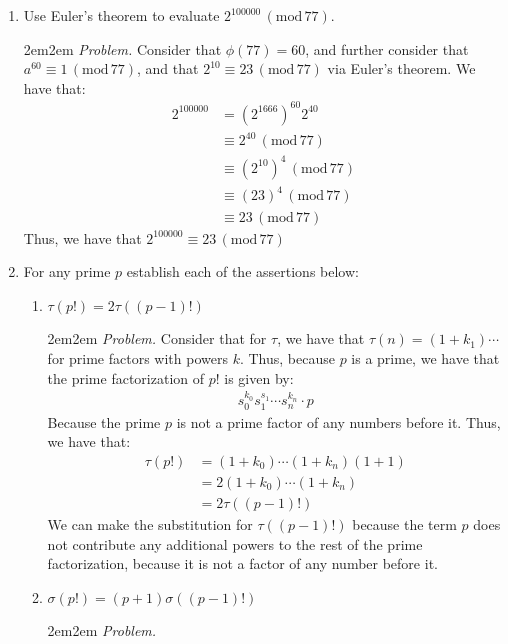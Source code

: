 \documentclass[10pt,oneside]{book}
\newcommand{\gspc}{\vspace{0.13cm}} %
\newcommand{\gmod}[1]{\,(\text{mod}\,#1)}
\let\endoldproof\endproof
\newenvironment{problem}[1]
  {\vspace{-0.1cm}\begin{coloredadjust}\begin{adjustwidth}{2em}{2em}
   \textit{Problem. }#1}
  {\endoldproof
\end{adjustwidth}\end{coloredadjust}\gspc}
\begin{document}
\begin{enumerate}
\begin{enumerate}
\begin{problem}
\begin{align*}
				&\equiv 21\cdot 25\cdot 10 \gmod{49}\\
				&\equiv 7 \gmod{49}
			\end{align*}
			Thus, $x \equiv 7 \gmod{49}$ is a valid solution. 
		\end{problem}
		\item [9.] Use Euler's theorem to evaluate $2^{100000}\gmod{77}$.
		\begin{problem}
			Consider that $\phi(77)= 60$, and further consider that $a^60\equiv 1\gmod{77}$, and that $2^{10}\equiv 23 \gmod{77}$ via Euler's theorem. We have that:
			\begin{align*}
				2^{100000}&= (2^{1666})^{60}2^{40}\\
				&\equiv 2^{40}\gmod{77}\\
				&\equiv (2^{10})^4\gmod{77}\\
				&\equiv (23)^4 \gmod{77}\\
				&\equiv 23 \gmod{77}
			\end{align*}
			Thus, we have that $2^{100000}\equiv 23 \gmod{77}$
		\end{problem}
		\item [11.] For any prime $p$ establish each of the assertions below:
		\begin{enumerate}
			\item $\tau(p!)=2\tau((p-1)!)$
			\begin{problem}
				Consider that for $\tau$, we have that $\tau(n) = (1+k_1)\cdots$ for prime factors with powers $k$. Thus, because $p$ is a prime, we have that the prime factorization of $p!$ is given by:
				\begin{align*}
					s_0^{k_0}s_1^{s_1}\cdots s_n^{k_n}\cdot p
				\end{align*}
				Because the prime $p$ is not a prime factor of any numbers before it. Thus, we have that:
				\begin{align*}
					\tau(p!) &= (1+k_0)\cdots(1+k_n)(1+1) \\
					&= 2(1+k_0)\cdots(1+k_n)\\
					&= 2\tau((p-1)!)
				\end{align*}
				We can make the substitution for $\tau((p-1)!)$ because the term $p$ does not contribute any additional powers to the rest of the prime factorization, because it is not a factor of any number before it. 
			\end{problem}
			\pagebreak
			\item $\sigma(p!) = (p+1)\sigma((p-1)!)$
			\begin{problem}

\end{problem}
\end{enumerate}
\end{enumerate}
\end{enumerate}
\end{document}
